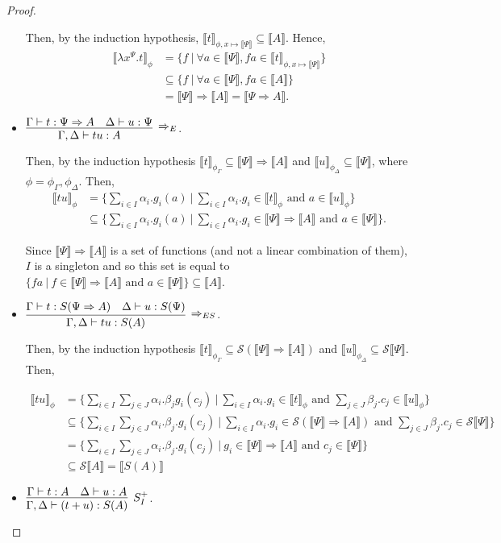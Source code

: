 \documentclass[preprint]{elsarticle}
\newcommand\gB{\ensuremath{\Psi}}
\newcommand\pair[2]{({#1}+{#2})}
\newcommand\gen{\mathcal S} \newcommand\den[1]{\llbracket #1 \rrbracket}
\begin{document}
\begin{proof}
\begin{itemize}
    Then, by the induction hypothesis, $\den
    t_{\phi,x\mapsto\den{\gB}}\subseteq\den A$. Hence,
    \begin{align*}
      \den{\lambda x^{\gB}.t}_\phi
      & =\{f~|~\forall a\in\den{\gB}, fa\in\den t_{\phi,x\mapsto\den{\gB}}\}\\
      &\subseteq\{f~|~\forall a\in\den{\gB}, fa\in\den A\}\\
      &=\den{\gB}\Rightarrow\den A=\den{\gB\Rightarrow A}.
    \end{align*}
  \item $\vcenter{\infer[\Rightarrow_E]{{\Gamma,\Delta\vdash
          tu:A}}{{\Gamma\vdash t:\gB\Rightarrow A} & {\Delta\vdash u:\gB}}}$.

    Then, by the induction hypothesis $\den
    t_{\phi_\Gamma}\subseteq\den{\gB}\Rightarrow\den A$ and $\den
    u_{\phi_\Delta}\subseteq\den{\gB}$, where $\phi=\phi_\Gamma,\phi_\Delta$.
    Then,
    \begin{align*}
      \den{tu}_\phi
      &= \{\sum_{i\in I}\alpha_i . g_i(a)~|~\sum_{i\in I}\alpha_i . g_i\in\den t_\phi\textrm{ and }a\in\den u_\phi\}\\
      &\subseteq
        \{\sum_{i\in I}\alpha_i . g_i(a)~|~\sum_{i\in I}\alpha_i . g_i\in\den{\gB}\Rightarrow\den A\textrm{ and }a\in\den{\gB}\}.
    \end{align*}

    Since $\den{\gB}\Rightarrow\den A$ is a set of functions (and not a linear
    combination of them), $I$ is a singleton and so this set is equal to
    $\{fa~|~f\in\den{\gB}\Rightarrow\den A\textrm{ and
    }a\in\den{\gB}\}\subseteq\den A$.
  \item $\vcenter{\infer[\Rightarrow_{ES}]{{\Gamma,\Delta\vdash
          tu:S(A)}}{{\Gamma\vdash t:S(\gB\Rightarrow A)} & {\Delta\vdash u:S(\gB)}}}$.

    Then, by the induction hypothesis $\den
    t_{\phi_\Gamma}\subseteq\gen(\den{\gB}\Rightarrow\den A)$ and $\den
    u_{\phi_\Delta}\subseteq\gen\den{\gB}$. Then,

    \begin{align*}
      \den{tu}_\phi &= \{\sum_{i\in I}\sum_{j\in J}\alpha_i . \beta_j g_i(c_j)~|~\sum_{i\in I}\alpha_i . g_i\in\den t_\phi\textrm{ and }\sum_{j\in J}\beta_j . c_j\in\den u_\phi\}\\
                    & \subseteq \{\sum_{i\in I}\sum_{j\in J}\alpha_i . \beta_j . g_i(c_j)~|~\sum_{i\in I}\alpha_i . g_i\in\gen(\den{\gB}\Rightarrow\den A)\textrm{ and }\sum_{j\in J}\beta_j . c_j\in\gen\den{\gB}\}\\
                    &= \{\sum_{i\in I}\sum_{j\in J}\alpha_i . \beta_j . g_i(c_j)~|~g_i\in\den{\gB}\Rightarrow\den A\textrm{ and }c_j\in\den{\gB}\}\\
                    &\subseteq \gen{\den A}=\den{S(A)}
    \end{align*}
  \item $\vcenter{\infer[S_I^+]{{\Gamma,\Delta\vdash\pair
          tu:S(A)}}{{\Gamma\vdash t:A} & {\Delta\vdash u:A}}}$.


\end{itemize}
\end{proof}
\end{document}
